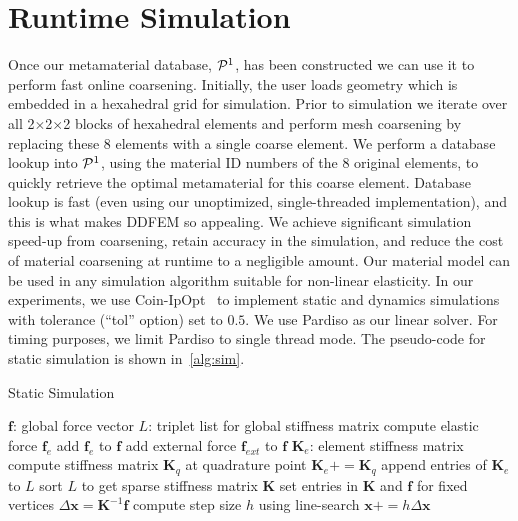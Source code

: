 \section{Runtime Simulation}
\label{sec:runtime}
Once our metamaterial database, $\mathcal{P}^1$, has been constructed we can use it to perform fast online coarsening. 
Initially, the user loads geometry which is embedded in a hexahedral grid for simulation. Prior to simulation we iterate over all 2$\times$2$\times$2 blocks of hexahedral elements and perform mesh coarsening by replacing these 8 elements with a single coarse element. We perform a database lookup into $\mathcal{P}^1$, using the material ID numbers of the 8 original elements, to quickly retrieve the optimal metamaterial for this coarse element. Database lookup is fast (even using our unoptimized, single-threaded implementation), and this is what makes DDFEM so appealing.
We achieve significant simulation speed-up from coarsening, retain accuracy in the simulation, and reduce the cost of material coarsening at runtime to a negligible amount.
	Our material model can be used in any simulation algorithm suitable for non-linear elasticity. In our experiments, we use Coin-IpOpt~\cite{ipopt} to implement static and dynamics simulations with tolerance (``tol'' option) set to $0.5$. We use Pardiso as our linear solver.
	For timing purposes, we limit Pardiso to single thread mode.
	The pseudo-code for static simulation is shown in~\autoref{alg:sim}.
\begin{algorithm}
	\caption{Static Simulation}\label{alg:sim}
	\begin{algorithmic}[1]
		\REPEAT
		\STATE $\mathbf{f}$: global force vector
		\STATE $L$: triplet list for global stiffness matrix
		\STATE compute elastic force $\mathbf{f}_e$
		\STATE add $\mathbf{f}_e$ to $\mathbf{f}$
		\ENDFOR
		\STATE add external force $\mathbf{f}_{ext}$ to $\mathbf{f}$
		\STATE $\mathbf{K}_e$: element stiffness matrix
		\STATE compute stiffness matrix $\mathbf{K}_q$ at quadrature point
		\STATE $\mathbf{K}_e+=\mathbf{K}_q$
		\ENDFOR
		\STATE append entries of $\mathbf{K}_e$ to $L$
		\ENDFOR
		\STATE sort $L$ to get sparse stiffness matrix $\mathbf{K}$
		\STATE set entries in $\mathbf{K}$ and $\mathbf{f}$ for fixed vertices
		\STATE $\Delta\mathbf{x}=\mathbf{K}^{-1}\mathbf{f}$
		\STATE compute step size $h$ using line-search
		\STATE $\mathbf{x}+=h\Delta\mathbf{x}$
	\end{algorithmic}
\end{algorithm}

